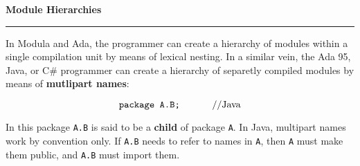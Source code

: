 \nopagenumbers
{\bf Module Hierarchies}
\vskip 1mm
\hrule

\vskip 6pt
In Modula and Ada, the programmer can create a hierarchy of modules within a single compilation unit by means of lexical nesting. In a similar vein, the Ada 95, Java, or C$\#$ programmer can create a hierarchy of separetly compiled modules by means of {\bf mutlipart names}:

$$\hbox{{\tt package A.B;} \quad\quad\quad //Java}$$

In this package {\tt A.B} is said to be a {\bf child} of package {\tt A}. In Java, multipart names work by convention only. If {\tt A.B} needs to refer to names in {\tt A}, then {\tt A} must make them public, and {\tt A.B} must import them.
\vfill\eject
\bye
